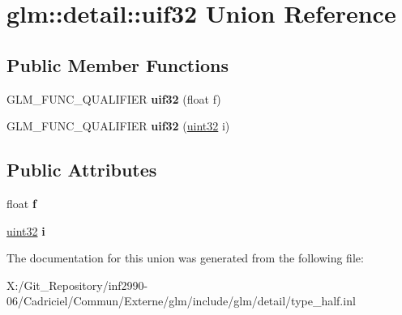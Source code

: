 \hypertarget{unionglm_1_1detail_1_1uif32}{\section{glm\-:\-:detail\-:\-:uif32 Union Reference}
\label{unionglm_1_1detail_1_1uif32}
}
\subsection*{Public Member Functions}
\begin{DoxyCompactItemize}
\item 
\hypertarget{unionglm_1_1detail_1_1uif32_ae86c2bd42a88f11e3217d14e46606971}{G\-L\-M\-\_\-\-F\-U\-N\-C\-\_\-\-Q\-U\-A\-L\-I\-F\-I\-E\-R {\bfseries uif32} (float f)}\label{unionglm_1_1detail_1_1uif32_ae86c2bd42a88f11e3217d14e46606971}

\item 
\hypertarget{unionglm_1_1detail_1_1uif32_a3d5981678c930776894daf8e94295fe2}{G\-L\-M\-\_\-\-F\-U\-N\-C\-\_\-\-Q\-U\-A\-L\-I\-F\-I\-E\-R {\bfseries uif32} (\hyperlink{group__gtc__type__precision_ga202b6a53c105fcb7e531f9b443518451}{uint32} i)}\label{unionglm_1_1detail_1_1uif32_a3d5981678c930776894daf8e94295fe2}

\end{DoxyCompactItemize}
\subsection*{Public Attributes}
\begin{DoxyCompactItemize}
\item 
\hypertarget{unionglm_1_1detail_1_1uif32_a5f697f84c5a8ec72c2f3a4f705f5bde8}{float {\bfseries f}}\label{unionglm_1_1detail_1_1uif32_a5f697f84c5a8ec72c2f3a4f705f5bde8}

\item 
\hypertarget{unionglm_1_1detail_1_1uif32_a981c1c59e160db23c73908cd7e629229}{\hyperlink{group__gtc__type__precision_ga202b6a53c105fcb7e531f9b443518451}{uint32} {\bfseries i}}\label{unionglm_1_1detail_1_1uif32_a981c1c59e160db23c73908cd7e629229}

\end{DoxyCompactItemize}


The documentation for this union was generated from the following file\-:\begin{DoxyCompactItemize}
\item 
X\-:/\-Git\-\_\-\-Repository/inf2990-\/06/\-Cadriciel/\-Commun/\-Externe/glm/include/glm/detail/type\-\_\-half.\-inl\end{DoxyCompactItemize}
